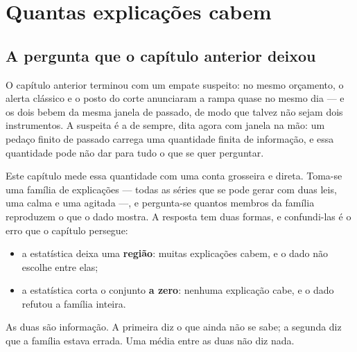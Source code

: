 %
%

\chapter{Quantas explicações cabem}
\label{cap:condicionamento}

\section{A pergunta que o capítulo anterior deixou}

O capítulo anterior terminou com um empate suspeito: no mesmo orçamento, o alerta clássico e o
posto do corte anunciaram a rampa quase no mesmo dia --- e os dois bebem da mesma janela de
passado, de modo que talvez não sejam dois instrumentos. A suspeita é a de sempre, dita agora
com janela na mão: um pedaço finito de passado carrega uma quantidade finita de informação, e
essa quantidade pode não dar para tudo o que se quer
perguntar\cite{masry1996minimum,paninski2003estimation}.

Este capítulo mede essa quantidade com uma conta grosseira e direta. Toma-se uma família de
explicações --- todas as séries que se pode gerar com duas leis, uma calma e uma agitada ---, e
pergunta-se quantos membros da família reproduzem o que o dado mostra. A resposta tem duas
formas, e confundi-las é o erro que o capítulo persegue:

\begin{itemize}[leftmargin=1.5em]
  \item a estatística deixa uma \textbf{região}: muitas explicações cabem, e o dado não escolhe
    entre elas;
  \item a estatística corta o conjunto \textbf{a zero}: nenhuma explicação cabe, e o dado
    refutou a família inteira.
\end{itemize}

As duas são informação. A primeira diz o que ainda não se sabe; a segunda diz que a família
estava errada. Uma média entre as duas não diz nada.

